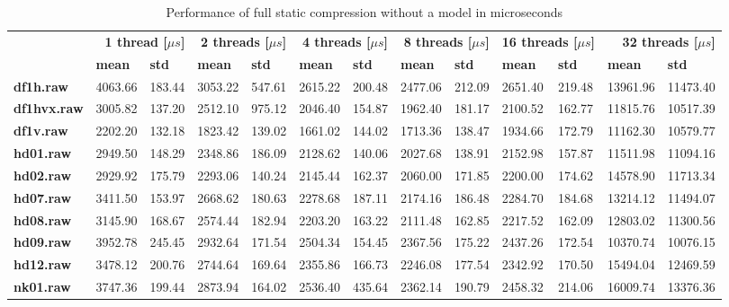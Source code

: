 \begin{table}[ht!]
\centering
\small
\begin{tabular}{l|ll|ll|ll|ll|ll|ll}
    & \multicolumn{2}{r|}{\textbf{1 thread [$\mu s$]}} & \multicolumn{2}{r|}{\textbf{2 threads [$\mu s$]}} & \multicolumn{2}{r|}{\textbf{4 threads [$\mu s$]}} & \multicolumn{2}{r|}{\textbf{8 threads [$\mu s$]}} & \multicolumn{2}{r|}{\textbf{16 threads [$\mu s$]}} & \multicolumn{2}{r}{\textbf{32 threads [$\mu s$]}} \\
    & \textbf{mean} & \textbf{std} & \textbf{mean} & \textbf{std} & \textbf{mean} & \textbf{std} & \textbf{mean} & \textbf{std} & \textbf{mean} & \textbf{std} & \textbf{mean} & \textbf{std} \\
\hline
    \textbf{df1h.raw} & 4063.66 & 183.44 & 3053.22 & 547.61 & 2615.22 & 200.48 & 2477.06 & 212.09 & 2651.40 & 219.48 & 13961.96 & 11473.40 \\
    \textbf{df1hvx.raw} & 3005.82 & 137.20 & 2512.10 & 975.12 & 2046.40 & 154.87 & 1962.40 & 181.17 & 2100.52 & 162.77 & 11815.76 & 10517.39 \\
    \textbf{df1v.raw} & 2202.20 & 132.18 & 1823.42 & 139.02 & 1661.02 & 144.02 & 1713.36 & 138.47 & 1934.66 & 172.79 & 11162.30 & 10579.77 \\
    \textbf{hd01.raw} & 2949.50 & 148.29 & 2348.86 & 186.09 & 2128.62 & 140.06 & 2027.68 & 138.91 & 2152.98 & 157.87 & 11511.98 & 11094.16 \\
    \textbf{hd02.raw} & 2929.92 & 175.79 & 2293.06 & 140.24 & 2145.44 & 162.37 & 2060.00 & 171.85 & 2200.00 & 174.62 & 14578.90 & 11713.34 \\
    \textbf{hd07.raw} & 3411.50 & 153.97 & 2668.62 & 180.63 & 2278.68 & 187.11 & 2174.16 & 186.48 & 2284.70 & 184.68 & 13214.12 & 11494.07 \\
    \textbf{hd08.raw} & 3145.90 & 168.67 & 2574.44 & 182.94 & 2203.20 & 163.22 & 2111.48 & 162.85 & 2217.52 & 162.09 & 12803.02 & 11300.56 \\
    \textbf{hd09.raw} & 3952.78 & 245.45 & 2932.64 & 171.54 & 2504.34 & 154.45 & 2367.56 & 175.22 & 2437.26 & 172.54 & 10370.74 & 10076.15 \\
    \textbf{hd12.raw} & 3478.12 & 200.76 & 2744.64 & 169.64 & 2355.86 & 166.73 & 2246.08 & 177.54 & 2342.92 & 170.50 & 15494.04 & 12469.59 \\
    \textbf{nk01.raw} & 3747.36 & 199.44 & 2873.94 & 164.02 & 2536.40 & 435.64 & 2362.14 & 190.79 & 2458.32 & 214.06 & 16009.74 & 13376.36 \\
\end{tabular}
\caption{Performance of full static compression without a model in microseconds}
\end{table}
